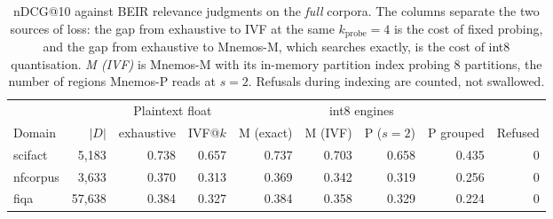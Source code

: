 \begin{table}[t]
\centering
\caption{nDCG@10 against BEIR relevance judgments on the \emph{full} corpora. The columns
separate the two sources of loss: the gap from exhaustive to IVF at the same
$k_{\mathrm{probe}}=4$ is the cost of fixed probing, and the gap from exhaustive to
Mnemos-M, which searches exactly, is the cost of int8 quantisation. \emph{M (IVF)} is Mnemos-M
with its in-memory partition index probing 8 partitions, the number of regions Mnemos-P reads at
$s{=}2$. Refusals during indexing are counted, not swallowed.}
\label{tab:e11}
\small
\setlength{\tabcolsep}{4pt}
\begin{tabular}{lrrrrrrrr}
\toprule
 & & \multicolumn{2}{c}{Plaintext float} & \multicolumn{4}{c}{int8 engines} & \\
\cmidrule(lr){3-4}\cmidrule(lr){5-8}
Domain & $|D|$ & exhaustive & IVF@$k$ & M (exact) & M (IVF) & P ($s{=}2$) & P grouped
 & Refused \\
\midrule
scifact & 5,183 & 0.738 & 0.657 & 0.737 & 0.703 & 0.658 & 0.435 & 0 \\
nfcorpus & 3,633 & 0.370 & 0.313 & 0.369 & 0.342 & 0.319 & 0.256 & 0 \\
fiqa & 57,638 & 0.384 & 0.327 & 0.384 & 0.358 & 0.329 & 0.224 & 0 \\
\bottomrule
\end{tabular}
\end{table}
